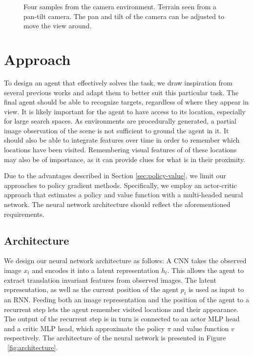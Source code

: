 \begin{figure}
    \centering
    
    \label{fig:camera}
    \caption[Camera environment]{Four samples from the camera environment. Terrain seen from a pan-tilt camera. The pan and tilt of the camera can be adjusted to move the view around.}
\end{figure}

\section{Approach}
\label{sec:approach}

To design an agent that effectively solves the task, we draw inspiration from several previous works and adapt them to better suit this particular task.
The final agent should be able to recognize targets, regardless of where they appear in view.
It is likely important for the agent to have access to its location, especially for large search spaces.
As environments are procedurally generated, a partial image observation of the scene is not sufficient to ground the agent in it.
It should also be able to integrate features over time in order to remember which locations have been visited.
Remembering visual features of of these locations may also be of importance, as it can provide clues for what is in their proximity.

Due to the advantages described in Section \ref{sec:policy-value}, we limit our approaches to policy gradient methods.
Specifically, we employ an actor-critic approach that estimates a policy and value function with a multi-headed neural network.
The neural network architecture should reflect the aforementioned requirements.

\subsection{Architecture}

We design our neural network architecture as follows:
A CNN takes the observed image \(x_t\) and encodes it into a latent representation \(h_t\).
This allows the agent to extract translation invariant features from observed images.
The latent representation, as well as the current position of the agent \(p_t\) is used as input to an RNN.
Feeding both an image representation and the position of the agent to a recurrent step lets the agent remember visited locations and their appearance.
The output of the recurrent step is in turn is connected to an actor MLP head and a critic MLP head, which approximate the policy \(\pi\) and value function \(v\) respectively.
The architecture of the neural network is presented in Figure ~\ref{fig:architecture}.

